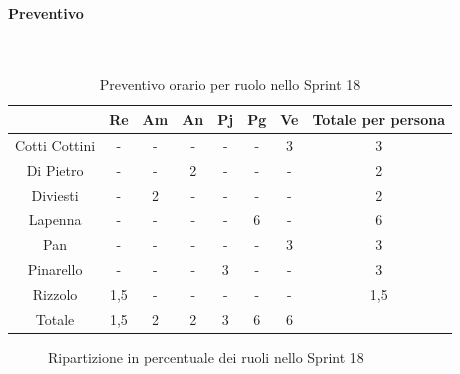 \documentclass{article}
\begin{document}
            \paragraph{Preventivo}\mbox{}\\
            \begin{table}[H]
                \centering
                \begin{tabular}{|c|c|c|c|c|c|c|c|}
                \hline
                              & Re  & Am  & An  & Pj  & Pg  & Ve  & Totale per persona \\ \hline
                Cotti Cottini & -   & -   & -   & -   & -   & 3   & 3                  \\ \hline
                Di Pietro     & -   & -   & 2   & -   & -   & -   & 2                  \\ \hline
                Diviesti      & -   & 2   & -   & -   & -   & -   & 2                  \\ \hline
                Lapenna       & -   & -   & -   & -   & 6   & -   & 6                  \\ \hline
                Pan           & -   & -   & -   & -   & -   & 3   & 3                  \\ \hline
                Pinarello     & -   & -   & -   & 3   & -   & -   & 3                  \\ \hline
                Rizzolo       & 1,5 & -   & -   & -   & -   & -   & 1,5                \\ \hline
                Totale        & 1,5 & 2   & 2   & 3   & 6   & 6   &                    \\ \hline
                \end{tabular}
                \caption{Preventivo orario per ruolo nello Sprint 18}
            \end{table}


            \begin{figure}[H]
                \centering
                \caption{Ripartizione in percentuale dei ruoli nello Sprint 18}
            \end{figure}


\end{document}
